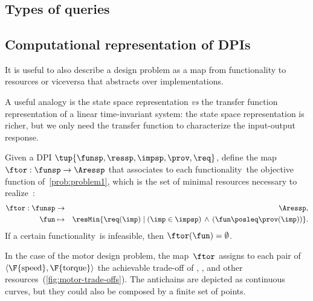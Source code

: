 
\chapter{}

\section{Types of queries}


\section{Computational representation of DPIs}

It is useful to also describe a design problem as a map from functionality to resources or viceversa that abstracts over implementations.

A useful analogy is the state space representation \emph{vs} the transfer function representation of a linear time-invariant system: the state space representation is richer, but we only need the transfer function to characterize the input-output response.


\begin{definition}
    \label{def:ftor}
    Given a DPI $\tup{ \funsp,\ressp,\impsp,\prov,\req} $,
    define the map~$\ftor:\funsp\rightarrow\Aressp$ that associates
    to each functionality~\fun the objective function of~\cref{prob:problem1},
    which is the set of minimal resources necessary to realize~\fun:
    \begin{eqnarray*}
        \ftor:\funsp & \rightarrow & \Aressp,\\
        \fun& \mapsto & \resMin\{\req(\imp)\mid\left(\imp\in\impsp\right)\,\wedge\,\left(\fun\posleq\prov(\imp)\right)\}.
    \end{eqnarray*}
    If a certain functionality~\fun is infeasible, then $\ftor(\fun)=\emptyset$.
\end{definition}



\begin{example}
    In the case of the motor design problem, the map~$\ftor$ assigns
    to each pair of $\left\langle \F{\text{speed}},\F{\text{torque}}\right\rangle $
    the achievable trade-off of , , and other resources~(\cref{fig:motor-trade-offs}).
    The antichains are depicted as continuous curves, but they could also
    be composed by a finite set of points.

\end{example}

